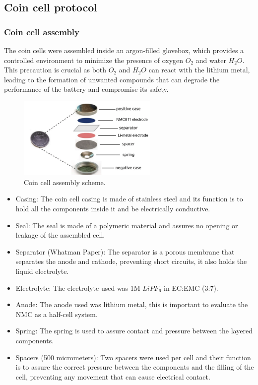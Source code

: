 \documentclass{article}
\begin{document}
\subsection{Coin cell protocol}
\subsubsection{Coin cell assembly}
The coin cells were assembled inside an argon-filled glovebox, which provides a controlled environment to minimize the presence of oxygen \(O_2\) and water \(H_2O\). This precaution is crucial as both \(O_2\)  and \(H_2O\) can react with the lithium metal, leading to the formation of unwanted compounds that can degrade the performance of the battery and compromise its safety.\\
\begin{figure}[H]
  \centering
  \includegraphics[width=0.6\textwidth]{coincell.png}
  \caption{Coin cell assembly scheme.}
  \label{fig:coin_cell}
\end{figure}
\begin {itemize}
\item Casing: The coin cell casing is made of stainless steel and its function is to hold all the components inside it and be electrically conductive.
\item Seal: The seal is made of a polymeric material and assures no opening or leakage of the assembled cell.  
\item Separator (Whatman Paper): The separator is a porous membrane that separates the anode and cathode, preventing short circuits, it also holds the liquid electrolyte. 
\item Electrolyte: The electrolyte used was 1M \(LiPF_6\) in EC:EMC (3:7).
\item Anode: The anode used was lithium metal, this is important to evaluate the NMC as a half-cell system. 
\item Spring: The spring is used to assure contact and pressure between the layered components. 
\item Spacers (500 micrometers): Two spacers were used per cell and their function is to assure the correct pressure between the components and the filling of the cell, preventing any movement that can cause electrical contact. 
\end{itemize}
\end{document}
